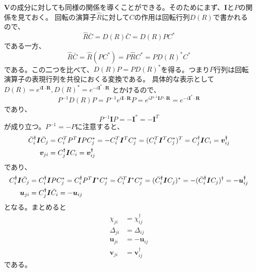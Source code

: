 \documentclass[11pt, aps, longbibliography]{article}
\begin{document}
        $\boldsymbol{V}$の成分に対しても同様の関係を導くことができる。そのためにまず、$\boldsymbol{I}$と$P$の関係を見ておく。
        回転の演算子$\hat{R}$に対して$C$の作用は回転行列$D(R)$で書かれるので、
        \begin{equation}\label{eq:append1-3}
            \hat{R}\bar{C} = D(R)\bar{C} = D(R)PC^*
        \end{equation}
        である一方、
        \begin{equation}\label{eq:append1-4}
            \hat{R}\bar{C} = \hat{R}(PC^*) = P\hat{R}C^* = PD(R)^*C^*
        \end{equation}
        である。この二つを比べて、$D(R)P = PD(R)^*$を得る。つまり$P$行列は回転演算子の表現行列を共役におくる変換である。
        具体的な表示として$D(R) = e^{i\boldsymbol{I}\cdot \boldsymbol{R}}, D(R)^* = e^{-i\boldsymbol{I}^* \cdot \boldsymbol{R}}$
        とかけるので、
        \begin{equation}\label{eq:append1-5}
            P^{-1} D(R)P = P^{-1} e^{i\boldsymbol{I}\cdot \boldsymbol{R}} P = e^{iP^{-1}\boldsymbol{I}P\cdot \boldsymbol{R}} = e^{-i\boldsymbol{I}^* \cdot \boldsymbol{R}}
        \end{equation}
        であり、
        \begin{equation}\label{eq:append1-6}
            P^{-1}\boldsymbol{I}P = -\boldsymbol{I}^* = -\boldsymbol{I}^T
        \end{equation}
        が成り立つ。$P^{-1}=-P$に注意すると、
        \begin{align}\label{eq:append1-8}
            \bar{C}_i^\dagger \boldsymbol{I}\bar{C}_j &= C_i^T P^T  \boldsymbol{I} P C_j^* = -C_i^T \boldsymbol{I}^T C_j^* = (C_i^T \boldsymbol{I}^T C_j^*)^T = C_j^\dagger\boldsymbol{I} C_i = \boldsymbol{v}_{ij}^\dagger \notag \\
            \boldsymbol{v}_{ji} &= C_j^\dagger \boldsymbol{I} C_i = \boldsymbol{v}_{ij}^\dagger 
        \end{align}
        であり、
        \begin{align}\label{eq:append1-9}
            C_i^\dagger \boldsymbol{I} \bar{C}_j &= C_i^\dagger \boldsymbol{I} P C_j^* = C_i^\dagger P^T \boldsymbol{I}^* C_j^* = \bar{C}_i^T\boldsymbol{I}^* C_j^* = (\bar{C}_i^\dagger \boldsymbol{I} C_j)^* = -(\bar{C}_i^\dagger \boldsymbol{I} C_j)^\dagger = -\boldsymbol{u}_{ij}^\dagger \notag \\
            \boldsymbol{u}_{ji} &=  C_j^\dagger \boldsymbol{I} \bar{C}_i = -\boldsymbol{u}_{ij}
        \end{align}
        となる。まとめると
        \begin{align}\label{eq:append1-10}
            \chi_{ji} &= \chi_{ij}^\dagger \\
            \Delta_{ji} &= \Delta_{ij} \\
            \boldsymbol{u}_{ji} &= -\boldsymbol{u}_{ij} \\
            \boldsymbol{v}_{ji} &=\boldsymbol{v}_{ij}^\dagger 
        \end{align}
        である。
\end{document}
